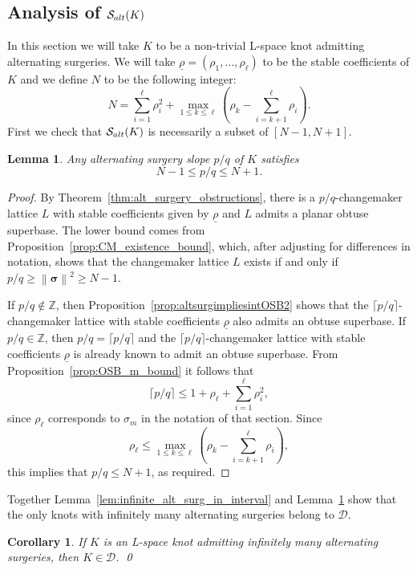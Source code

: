 \documentclass{amsart} %
\newcommand{\D}{\mathcal{D}}
\newcommand{\Z}{\mathbb{Z}}
\newcommand{\Salt}{\mathcal{S}_{\rm alt}}
\newcommand{\bsigma}{\bm{\sigma}}
\newcommand{\norm}[1]{\left\lVert #1 \right\rVert^2}
\theoremstyle{thm}
\newtheorem{lem}[Theorem]{Lemma}
\newtheorem{cor}[Theorem]{Corollary}
\theoremstyle{definition}
\numberwithin{equation}{section}
\begin{document}
\subsection{Analysis of \texorpdfstring{$\Salt(K)$}{Salt(K)}}
In this section we will take $K$ to be a non-trivial L-space knot admitting alternating surgeries. We will take $\underline{\rho}=(\rho_1,\dots, \rho_\ell)$ to be the stable coefficients of $K$ and we define $N$ to be the following integer:
\begin{equation}\label{eq:N_def}
    N=\sum_{i=1}^\ell \rho_i^2 + \max_{1\leq k \leq \ell} \left(\rho_k - \sum_{i=k+1}^{\ell} \rho_i \right).
\end{equation}
First we check that $\Salt(K)$ is necessarily a subset of $[N-1,N+1]$.
\begin{lem} \label{lem:salt_bounds}
    Any alternating surgery slope $p/q$ of $K$ satisfies
    \[
    N-1\leq p/q\leq N+1.
    \]    
\end{lem}
\begin{proof}
By Theorem~\ref{thm:alt_surgery_obstructions}, there is a $p/q$-changemaker lattice $L$ with stable coefficients given by $\underline{\rho}$ and $L$ admits a planar obtuse superbase. The lower bound comes from Proposition~\ref{prop:CM_existence_bound}, which, after adjusting for differences in notation, shows that the changemaker lattice $L$ exists if and only if $p/q\geq \norm{\bsigma} \geq N-1$.

If $p/q\not \in \Z$, then Proposition~\ref{prop:altsurgimpliesintOSB2} shows that the $\lceil p/q\rceil$-changemaker lattice with stable coefficients $\underline{\rho}$ also admits an obtuse superbase. If $p/q \in \Z$, then $p/q=\lceil p/q \rceil$ and the $\lceil p/q\rceil$-changemaker lattice with stable coefficients $\underline{\rho}$ is already known to admit an obtuse superbase. From Proposition~\ref{prop:OSB_m_bound} it follows that
    \[
    \lceil p/q\rceil \leq 1+\rho_\ell +\sum_{i=1}^\ell \rho_i^2,
    \]
    since $\rho_\ell$ corresponds to $\sigma_m$ in the notation of that section. Since
    \[
    \rho_\ell \leq \max_{1\leq k \leq \ell} \left(\rho_k - \sum_{i=k+1}^{\ell} \rho_i \right),
    \]
    this implies that $p/q \leq N+1$, as required.
\end{proof}

Together Lemma~\ref{lem:infinite_alt_surg_in_interval} and Lemma~\ref{lem:salt_bounds} show that the only knots with infinitely many alternating surgeries belong to $\D$.
\begin{cor}\label{cor:infte_alt_surg}
If $K$ is an L-space knot admitting infinitely many alternating surgeries, then $K\in\D$. \qed
\end{cor}
\end{document}
